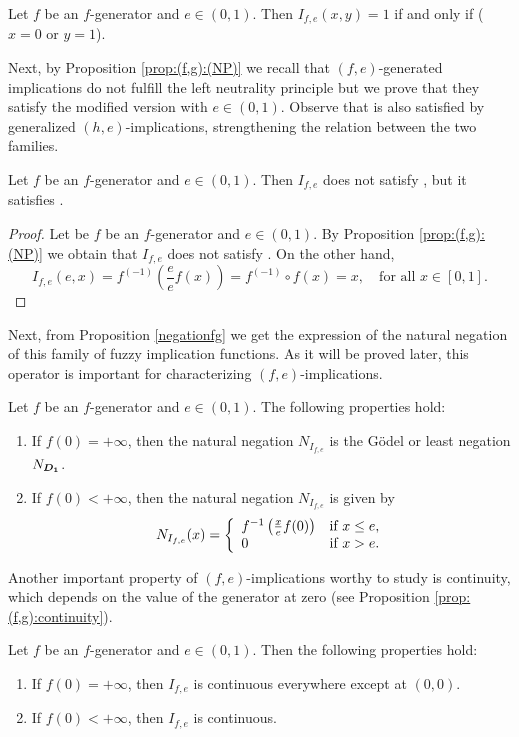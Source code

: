 \begin{corollary}
	\label{onezone(f,e)} 
	Let $f$ be an $f$-generator and $e\in(0,1)$. Then $I_{f,e}(x,y)=1$ if and only if ($x=0$ or $y=1$).
\end{corollary}

Next, by Proposition \ref{prop:(f,g):(NP)} we recall that  $(f,e)$-generated implications do not fulfill the left neutrality principle \NP but we prove that they satisfy the modified version with $e\in(0,1)$. Observe that \NPe is also satisfied by generalized $(h,e)$-implications, strengthening the relation between the two families.

\begin{corollary} 
	Let $f$ be an $f$-generator  and $e\in(0,1)$. Then $I_{f,e}$ does not satisfy \NP, but it satisfies \NPe.
\end{corollary}
\begin{proof}
	Let be $f$ be an $f$-generator and $e \in (0,1)$. By Proposition \ref{prop:(f,g):(NP)} we obtain that $I_{f,e}$ does not satisfy \NP. On the other hand,
	$$I_{f,e}(e,x) = f^{(-1)}\left(\frac{e}{e}f(x)\right)=f^{(-1)} \circ f(x)=x, \quad \text{for all } x \in [0,1].$$
\end{proof}

Next, from Proposition \ref{negationfg} we get the expression of the natural negation of this family of fuzzy implication functions. As it will be proved later, this operator is important for characterizing $(f,e)$-implications.
\begin{corollary}
	Let $f$ be an $f$-generator and $e\in(0,1)$. The following properties hold:
	\begin{enumerate}[label=(\roman*)]
		\item If $f(0)=+\infty$, then the natural negation $N_{I_{f,e}}$ is the G\"odel or least negation $N_{\bm{D_1}}$.
		\item If $f(0)<+\infty$, then the natural negation $N_{I_{f,e}}$ is given by
		$$N_{I_{f,e}}(x)=\left\{\begin{array}{ll} f^{-1}\left( \frac{x}{e}f(0)\right)&\hbox{if } x\leq e,\\ 0&\hbox{if } x>e.\end{array}\right.$$ 
	\end{enumerate}
	\label{negation}
\end{corollary}

Another important property of $(f,e)$-implications worthy to study is continuity, which depends on the value of the generator at zero (see Proposition \ref{prop:(f,g):continuity}).
\begin{corollary}
	\label{continuity(f,e)}
	Let $f$ be an $f$-generator  and $e\in(0,1)$. Then the following properties hold:
	\begin{enumerate}[label=(\roman*)]
		\item If $f(0)=+\infty$, then $I_{f,e}$ is continuous everywhere except at $(0,0)$.
		\item If $f(0)<+\infty$, then $I_{f,e}$ is continuous.
	\end{enumerate}
\end{corollary}

